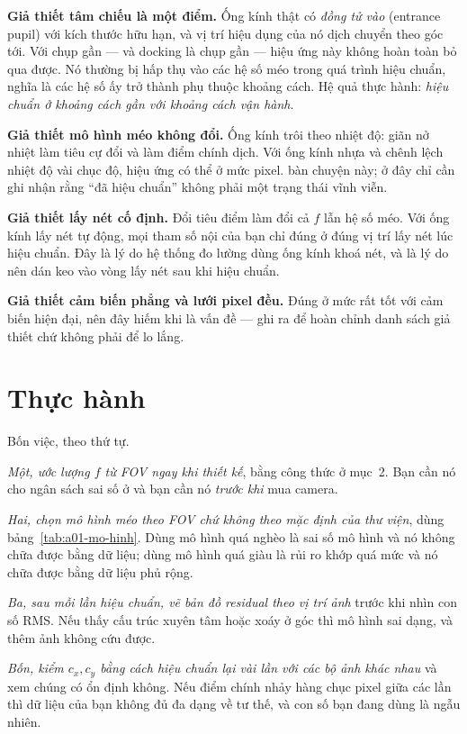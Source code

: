 \documentclass[../../marker.tex]{subfiles}
\begin{document}
\textbf{Giả thiết tâm chiếu là một điểm.} Ống kính thật có \emph{đồng tử vào} (entrance pupil) với kích thước hữu hạn, và vị trí hiệu dụng của nó dịch chuyển theo góc tới. Với chụp gần --- và docking là chụp gần --- hiệu ứng này không hoàn toàn bỏ qua được. Nó thường bị hấp thụ vào các hệ số méo trong quá trình hiệu chuẩn, nghĩa là các hệ số ấy trở thành phụ thuộc khoảng cách. Hệ quả thực hành: \emph{hiệu chuẩn ở khoảng cách gần với khoảng cách vận hành}.

\textbf{Giả thiết mô hình méo không đổi.} Ống kính trôi theo nhiệt độ: giãn nở nhiệt làm tiêu cự đổi và làm điểm chính dịch. Với ống kính nhựa và chênh lệch nhiệt độ vài chục độ, hiệu ứng có thể ở mức pixel.  bàn chuyện này; ở đây chỉ cần ghi nhận rằng ``đã hiệu chuẩn'' không phải một trạng thái vĩnh viễn.

\textbf{Giả thiết lấy nét cố định.} Đổi tiêu điểm làm đổi cả \(f\) lẫn hệ số méo. Với ống kính lấy nét tự động, mọi tham số nội của bạn chỉ đúng ở đúng vị trí lấy nét lúc hiệu chuẩn. Đây là lý do hệ thống đo lường dùng ống kính khoá nét, và là lý do nên dán keo vào vòng lấy nét sau khi hiệu chuẩn.

\textbf{Giả thiết cảm biến phẳng và lưới pixel đều.} Đúng ở mức rất tốt với cảm biến hiện đại, nên đây hiếm khi là vấn đề --- ghi ra để hoàn chỉnh danh sách giả thiết chứ không phải để lo lắng.

\section{Thực hành}

Bốn việc, theo thứ tự.

\emph{Một, ước lượng \(f\) từ FOV ngay khi thiết kế}, bằng công thức ở mục~2. Bạn cần nó cho ngân sách sai số ở  và bạn cần nó \emph{trước khi} mua camera.

\emph{Hai, chọn mô hình méo theo FOV chứ không theo mặc định của thư viện}, dùng bảng~\ref{tab:a01-mo-hinh}. Dùng mô hình quá nghèo là sai số mô hình và nó không chữa được bằng dữ liệu; dùng mô hình quá giàu là rủi ro khớp quá mức và nó chữa được bằng dữ liệu phủ rộng.

\emph{Ba, sau mỗi lần hiệu chuẩn, vẽ bản đồ residual theo vị trí ảnh} trước khi nhìn con số RMS. Nếu thấy cấu trúc xuyên tâm hoặc xoáy ở góc thì mô hình sai dạng, và thêm ảnh không cứu được.

\emph{Bốn, kiểm \(c_x, c_y\) bằng cách hiệu chuẩn lại vài lần với các bộ ảnh khác nhau} và xem chúng có ổn định không. Nếu điểm chính nhảy hàng chục pixel giữa các lần thì dữ liệu của bạn không đủ đa dạng về tư thế, và con số bạn đang dùng là ngẫu nhiên.
\end{document}
